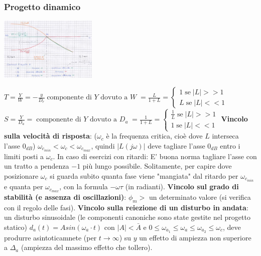 \begin{landscape}
\begin{multicols*}{3}
    \subsubsection*{Progetto dinamico}
    \begin{center}
        \includegraphics[height=3cm]{../formulario/img3.JPG}
    \end{center}
    $T = \frac{Y}{W} = - \frac{y}{D_r}\; \text{componente di $Y$ dovuto a $W$}\; = \frac{L}{1+L} = \begin{cases}
        1 \; \text{se}\; |L| >> 1\\
        L \; \text{se}\; |L| << 1
    \end{cases}$\newline
    $S = \frac{Y}{D_a} =\; \text{componente di $Y$ dovuto a $D_a$}\; = \frac{1}{1+L} = \begin{cases}
        \frac{1}{L} \; \text{se}\; |L| >> 1\\
        1 \; \text{se}\; |L| << 1
    \end{cases}$\newline
    \newline
    \textbf{Vincolo sulla velocità di risposta}: ($\omega_c$ è la frequenza critica, cioè dove $L$ interseca l'asse $0_{dB}$) $\omega_{c_{min}} < \omega_c < \omega_{c_{max}}$, quindi $|L(j \omega)|$ deve tagliare l'asse $0_{dB}$ entro i limiti posti a $\omega_c$. \newline
    In caso di esercizi con ritardi: E' buona norma tagliare l'asse con un tratto a pendenza $-1$ più lungo possibile. Solitamente, per capire dove posizionare $\omega_c$ si guarda subito quanta fase viene "mangiata" dal ritardo per $\omega_{c_{min}}$ e quanta per $\omega_{c_{max}}$, con la formula $-\omega \tau$ (in radianti).\newline
    \textbf{Vincolo sul grado di stabilità (e assenza di oscillazioni)}: $\phi_m > $ un determinato valore (si verifica con il regolo delle fasi).\newline
    \textbf{Vincolo sulla reiezione di un disturbo in andata}: un disturbo sinusoidale (le componenti canoniche sono state gestite nel progetto statico) $d_a(t) = A sin (\omega_a \cdot  t)$ con $|A| < \bar{A}$ e $0 \leq \omega_{a_1} \leq \omega_a \leq \omega_{a_2} \leq \omega_c$, deve produrre asintoticamnete (per $t \rightarrow \infty$) su $y$ un effetto di ampiezza non superiore a $\Delta_a$ (ampiezza del massimo effetto che tollero).\newline

\end{multicols*}
\end{landscape}
